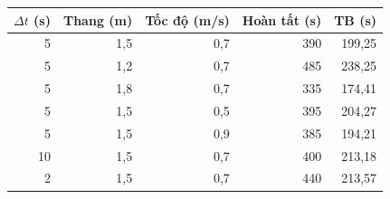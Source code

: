 \small\begin{tabular}{rrrrr}
\toprule
$\Delta t$ (s) & Thang (m) & Tốc độ (m/s) & Hoàn tất (s) & TB (s)\\\midrule
5 & 1,5 & 0,7 & 390 & 199,25\\
5 & 1,2 & 0,7 & 485 & 238,25\\
5 & 1,8 & 0,7 & 335 & 174,41\\
5 & 1,5 & 0,5 & 395 & 204,27\\
5 & 1,5 & 0,9 & 385 & 194,21\\
10 & 1,5 & 0,7 & 400 & 213,18\\
2 & 1,5 & 0,7 & 440 & 213,57\\
\bottomrule\end{tabular}
